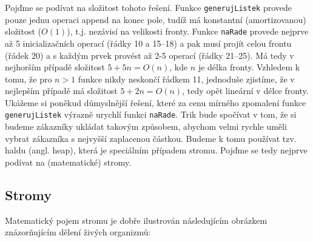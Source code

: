 Pojďme se podívat na složitost tohoto řešení. Funkce {\tt generujListek} provede pouze jednu operaci append na konec pole, tudíž má konstantní (amortizovanou)
složitost ($O(1)$), t.j. nezávisí na velikosti fronty. Funkce {\tt naRade} provede nejprve až 5 inicializačních operací (řádky 10 a 15--18)
a pak musí projít celou frontu (řádek 20) a s každým prvek provést až 2-5 operací (řádky 21--25). Má tedy v nejhorším případě složitost $5 + 5n = O(n)$,
kde $n$ je délka fronty. Vzhledem k tomu, že pro $n>1$ funkce nikdy neskončí řádkem 11, jednoduše zjistíme, že v nejlepším případě má složitost
$5 + 2n = O(n)$, tedy opět lineární v délce fronty. Ukážeme si poněkud důmyslnější řešení, které za cenu mírného zpomalení funkce {\tt generujListek}
výrazně urychlí funkci {\tt naRade}. Trik bude spočívat v tom, že si budeme zákazníky ukládat takovým způsobem, abychom velmi rychle uměli vybrat zákazníka
s nejvyšší zaplacenou částkou. Budeme k tomu používat tzv. haldu (angl. heap), která je speciálním případem stromu.
Pojďme se tedy nejprve podívat na (matematické) stromy.


\subsection*{Stromy} 

Matematický pojem stromu je dobře ilustrován následujícím obrázkem znázorňujícím dělení živých organizmů:

\begin{center}
\end{center}


